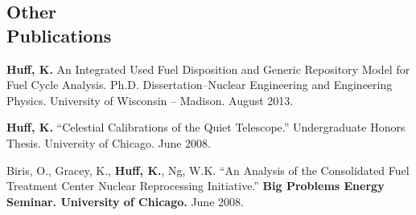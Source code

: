 \documentclass[margin,line]{resume}
\begin{document}
\begin{resume}
    \section{\mysidestyle Other\\Publications}
    \begin{bibenum}
      \item \textbf{Huff, K.} An Integrated Used Fuel Disposition and Generic Repository Model for Fuel Cycle Analysis.
        Ph.D. Dissertation--Nuclear Engineering and Engineering
        Physics. University of Wisconsin -- Madison.  August 2013.
      \item \textbf{Huff, K.} ``Celestial Calibrations of the Quiet Telescope.''
        Undergraduate Honors Thesis. University of Chicago. June 2008.
      \item Biris, O., Gracey, K., \textbf{Huff, K.}, Ng, W.K.
        ``An Analysis of the Consolidated Fuel Treatment Center Nuclear
        Reprocessing Initiative.''
        \textbf{Big Problems Energy Seminar. University of Chicago.} June 2008.
    \end{bibenum}

\end{resume}
\end{document}
